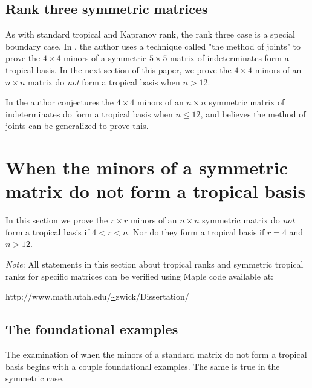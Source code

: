 \documentclass{article}
\begin{document}
\subsection{Rank three symmetric matrices}

As with standard tropical and Kapranov rank, the rank three case is a special boundary case. In \cite{z}, the author uses a technique called "the method of joints" to prove the $4 \times 4$ minors of a symmetric $5 \times 5$ matrix of indeterminates form a tropical basis. In the next section of this paper, we prove the $4 \times 4$ minors of an $n \times n$ matrix do \emph{not} form a tropical basis when $n > 12$.

In \cite{z} the author conjectures the $4 \times 4$ minors of an $n \times n$ symmetric matrix of indeterminates do form a tropical basis when $n \leq 12$, and believes the method of joints can be generalized to prove this.

\section{When the minors of a symmetric matrix do not form a tropical basis}

In this section we prove the $r \times r$ minors of an $n \times n$  symmetric matrix do \emph{not} form a tropical basis if $4 < r < n$. Nor do they form a tropical basis if $r = 4$ and $n > 12$.

\emph{Note}: All statements in this section about tropical ranks and symmetric tropical ranks for specific matrices can be verified using Maple code available at: 

http://www.math.utah.edu/\url{~}zwick/Dissertation/

\subsection{The foundational examples}

The examination of when the minors of a standard matrix do not form a tropical basis begins with a couple foundational examples. The same is true in the symmetric case. 
\end{document}

